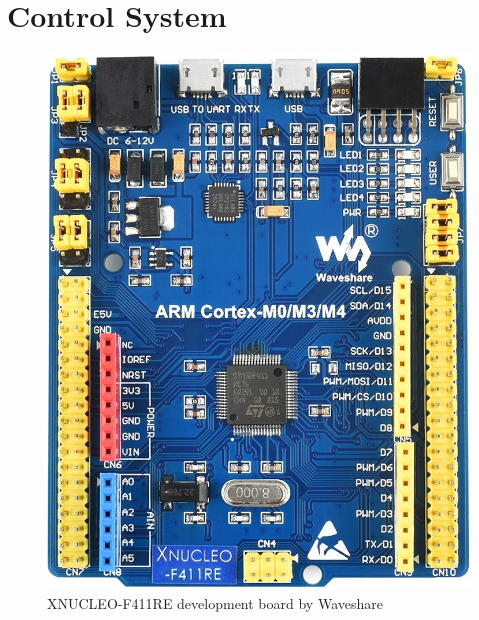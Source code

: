 \section{Control System}
\begin{figure}[htbp]
	\centering
	\includegraphics[width=.8\textwidth]{Figures/3_xnucleo_f411re.jpg}
	\caption{XNUCLEO-F411RE development board by Waveshare}
	\label{fig:3_xnucleo_f411re_pcb}
\end{figure}
